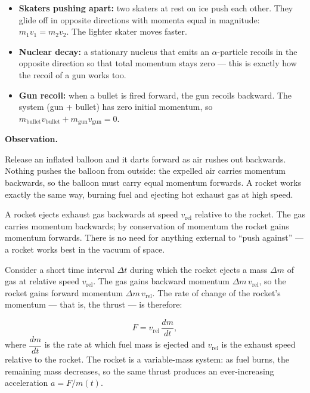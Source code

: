 \documentclass[11pt]{article}
\newcommand{\cle}[1]{{\popxbold\color{popdark}#1}}
\newcounter{popsec}
\newcounter{popsub}
\newcommand{\courssub}[1]{%
  \stepcounter{popsub}%
  \par\vspace{9pt}\noindent{\popxbold\fontsize{11.5}{13}\selectfont\color{popink}{\color{poporange}\thepopsec.\thepopsub}\hspace{6pt}#1}\par\nopagebreak\vspace{4pt}
}
\begin{document}
\begin{exemplebox}
\begin{itemize}
\item \textbf{Skaters pushing apart:} two skaters at rest on ice push each other. They glide off in opposite directions with momenta equal in magnitude: $m_1v_1=m_2v_2$. The lighter skater moves faster.
\item \textbf{Nuclear decay:} a stationary nucleus that emits an $\alpha$-particle recoils in the opposite direction so that total momentum stays zero — this is exactly how the recoil of a gun works too.
\item \textbf{Gun recoil:} when a bullet is fired forward, the gun recoils backward. The system (gun + bullet) has zero initial momentum, so $m_{\text{bullet}}v_{\text{bullet}} + m_{\text{gun}}v_{\text{gun}} = 0$.
\end{itemize}
\end{exemplebox}

\courssub{Rocket Motion}

\textbf{Observation.}\par
Release an inflated balloon and it darts forward as air rushes out backwards. Nothing pushes the balloon from outside: the expelled air carries momentum backwards, so the balloon must carry equal momentum forwards. A rocket works exactly the same way, burning fuel and ejecting hot exhaust gas at high speed.

\begin{propriete}
A rocket ejects exhaust gas backwards at speed $v_{\text{rel}}$ relative to the rocket. The gas carries momentum backwards; by conservation of momentum the rocket gains momentum forwards. There is no need for anything external to ``push against'' — a rocket works best in the vacuum of space.
\end{propriete}

Consider a short time interval $\Delta t$ during which the rocket ejects a mass $\Delta m$ of gas at relative speed $v_{\text{rel}}$. The gas gains backward momentum $\Delta m\,v_{\text{rel}}$, so the rocket gains forward momentum $\Delta m\,v_{\text{rel}}$. The rate of change of the rocket's momentum — that is, the \cle{thrust} — is therefore:

\begin{propriete}
\[
F=v_{\text{rel}}\,\frac{dm}{dt},
\]
where $\dfrac{dm}{dt}$ is the rate at which fuel mass is ejected and $v_{\text{rel}}$ is the exhaust speed relative to the rocket. The rocket is a \cle{variable-mass} system: as fuel burns, the remaining mass decreases, so the same thrust produces an ever-increasing acceleration $a=F/m(t)$.
\end{propriete}
\end{document}
